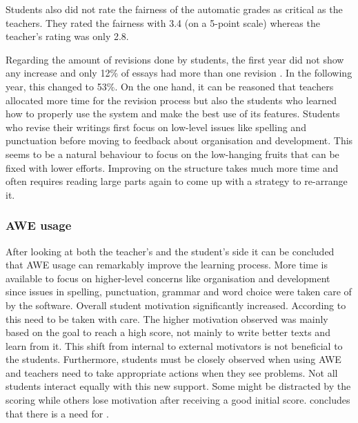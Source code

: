 \documentclass[runningheads]{llncs}
\begin{document}
Students also did not rate the fairness of the automatic grades as critical as the teachers. They rated the fairness with 3.4 (on a 5-point scale) whereas the teacher's rating was only 2.8.

Regarding the amount of revisions done by students, the first year did not show any increase and only 12\% of essays had more than one revision \citep{grimes_utility_2010}. In the following year, this changed to 53\%. On the one hand, it can be reasoned that teachers allocated more time for the revision process but also the students who learned how to properly use the system and make the best use of its features. Students who revise their writings first focus on low-level issues like spelling and punctuation before moving to feedback about organisation and development. This seems to be a natural behaviour to focus on the low-hanging fruits that can be fixed with lower efforts. Improving on the structure takes much more time and often requires reading large parts again to come up with a strategy to re-arrange it.

\subsubsection{AWE usage} After looking at both the teacher's and the student's side it can be concluded that AWE usage can remarkably improve the learning process. More time is available to focus on higher-level concerns like organisation and development since issues in spelling, punctuation, grammar and word choice were taken care of by the software. Overall student motivation significantly increased. According to \textcite{grimes_utility_2010} this need to be taken with care. The higher motivation observed was mainly based on the goal to reach a high score, not mainly to write better texts and learn from it. This shift from internal to external motivators is not beneficial to the students. Furthermore, students must be closely observed when using AWE and teachers need to take appropriate actions when they see problems. Not all students interact equally with this new support. Some might be distracted by the scoring while others lose motivation after receiving a good initial score. \citeauthor{grimes_utility_2010} concludes that there is a need for .
\end{document}
